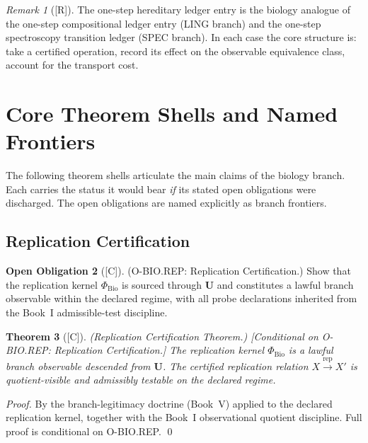 \documentclass[12pt,oneside]{amsbook}
\theoremstyle{plain}
\newtheorem{theorem}{Theorem}[section]
\theoremstyle{definition}
\newtheorem{obligation}[theorem]{Open Obligation}
\theoremstyle{remark}
\newtheorem{remark}[theorem]{Remark}
\newcommand{\status}[1]{\textup{[#1]}}
\begin{document}
\begin{remark}[\status{R}]\label{rem:bio-heredity-note}
The one-step hereditary ledger entry is the biology analogue of the
one-step compositional ledger entry (LING branch) and the one-step
spectroscopy transition ledger (SPEC branch). In each case the core
structure is: take a certified operation, record its effect on the
observable equivalence class, account for the transport cost.
\end{remark}

\section{Core Theorem Shells and Named Frontiers}
\label{sec:bio-theorems}

The following theorem shells articulate the main claims of the
biology branch. Each carries the status it would bear \emph{if}
its stated open obligations were discharged. The open obligations
are named explicitly as branch frontiers.

\subsection{Replication Certification}\label{sec:bio-REP}

\begin{obligation}[\status{C}]\label{ob:bio-REP}
\textup{(O-BIO.REP: Replication Certification.)}
Show that the replication kernel $\Phi_{\mathrm{Bio}}$ is sourced
through $\mathbf{U}$ and constitutes a lawful branch observable within
the declared regime, with all probe declarations inherited from the
Book~I admissible-test discipline.
\end{obligation}

\begin{theorem}[\status{C}]\label{thm:bio-rep-certification}
\textup{(Replication Certification Theorem.)}
\textup{[Conditional on O-BIO.REP: Replication Certification.]}
The replication kernel $\Phi_{\mathrm{Bio}}$ is a lawful branch
observable descended from $\mathbf{U}$. The certified replication
relation $X \xrightarrow{\mathrm{rep}} X'$ is quotient-visible and
admissibly testable on the declared regime.
\end{theorem}

\begin{proof}
By the branch-legitimacy doctrine (Book~V) applied to the declared
replication kernel, together with the Book~I observational quotient
discipline. Full proof is conditional on O-BIO.REP.
\qed
\end{proof}
\end{document}
